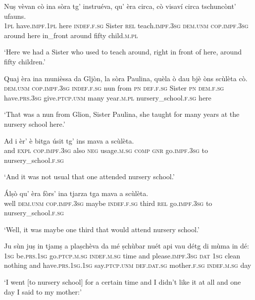\begin{linenumbers}
\gll Nuṣ vèvan cò ina sòra tg' instruéva, qu' èra circa, cò visaví circa tschuncònt’ ufauns. \\
\textsc{1pl} have.\textsc{impf.1pl} here \textsc{indef.f.sg} Sister \textsc{rel} teach.\textsc{impf.3sg} \textsc{dem.unm} \textsc{cop.impf.3sg} around here in\_front around fifty child.\textsc{m.pl}\\
\end{linenumbers}
\medskip
\glt `Here we had a Sister who used to teach around, right in front of here, around fifty children.'
\medskip

\begin{linenumbers}
\gll Quaj èra ina munièssa da Gljòn, la sòra Paulina, quèla ò dau bjè òns scùlèta cò.\\
\textsc{dem.unm} \textsc{cop.impf.3sg} \textsc{indef.f.sg} nun from \textsc{pn} \textsc{def.f.sg} Sister \textsc{pn} \textsc{dem.f.sg}  have.\textsc{prs.3sg} give.\textsc{ptcp.unm} many year.\textsc{m.pl} nursery\_school.\textsc{f.sg} here\\
\end{linenumbers}
\medskip
\glt `That was a nun from Glion, Sister Paulina, she taught for many years at the nursery school here.'
\medskip

\begin{linenumbers}
\gll Ad i èr’ è bitga úsit tg’ ins mava a scùlèta.\\
and  \textsc{expl} \textsc{cop.impf.3sg} also \textsc{neg} usage.\textsc{m.sg}  \textsc{comp} \textsc{gnr} go.\textsc{impf.3sg} to nursery\_school.\textsc{f.sg}\\
\end{linenumbers}
\medskip
\glt `And it was not usual that one attended nursery school.'
\medskip

\begin{linenumbers}
\gll  Álṣò qu’ èra fòrs’ ina tjarza tga mava a scùlèta.  \\
well \textsc{dem.unm} \textsc{cop.impf.3sg} maybe \textsc{indef.f.sg} third \textsc{rel} go.\textsc{impf.3sg} to nursery\_school.\textsc{f.sg}\\
\end{linenumbers}
\medskip
\glt `Well, it was maybe one third that would attend nursery school.'
\medskip

\begin{linenumbers}
\gll  Ju sùn juṣ in tjamṣ a plaṣchèva da mé ṣchùbar nuét api vau détg di mùma in dé: \\
 \textsc{1sg} be.\textsc{prs.1sg} go.\textsc{ptcp.m.sg} \textsc{indef.m.sg} time and please.\textsc{impf.3sg} \textsc{dat} \textsc{1sg} clean nothing and have.\textsc{prs.1sg.1sg} say.\textsc{ptcp.unm} \textsc{def.dat.sg} mother.\textsc{f.sg} \textsc{indef.m.sg} day\\
\end{linenumbers}
\medskip
\glt `I went [to nursery school] for a certain time and I didn’t like it at all and one day I said to my mother:'
\medskip

